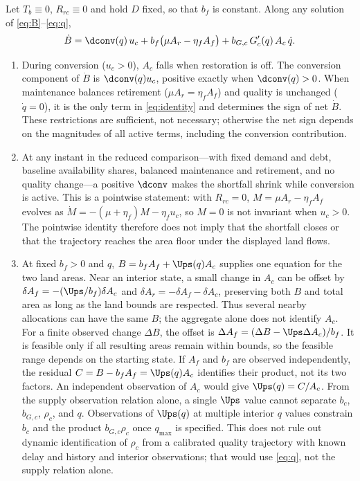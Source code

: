 \begin{proposition}\label{prop:mask}
Let $T_b\equiv0$, $R_{rc}\equiv0$ and hold $D$ fixed, so that $b_f$ is constant. Along any solution of \eqref{eq:B}--\eqref{eq:q},
\begin{equation}\label{eq:identity}
\dot B=\dconv(q)\,u_c+b_f\big(\mu A_r-\eta_f A_f\big)+b_{G,c}\,G_c'(q)\,A_c\,\dot q .
\end{equation}
\begin{enumerate}[label=(\roman*)]
\item During conversion ($u_c>0$), $A_c$ falls when restoration is off. The conversion component of $\dot B$ is $\dconv(q)u_c$, positive exactly when $\dconv(q)>0$. When maintenance balances retirement ($\mu A_r=\eta_fA_f$) and quality is unchanged ($\dot q=0$), it is the only term in \eqref{eq:identity} and determines the sign of net $\dot B$. These restrictions are sufficient, not necessary; otherwise the net sign depends on the magnitudes of all active terms, including the conversion contribution.
\item At any instant in the reduced comparison—with fixed demand and debt, baseline availability shares, balanced maintenance and retirement, and no quality change—a positive $\dconv$ makes the shortfall shrink while conversion is active. This is a pointwise statement: with $R_{rc}=0$, $M=\mu A_r-\eta_fA_f$ evolves as $\dot M=-(\mu+\eta_f)M-\eta_fu_c$, so $M=0$ is not invariant when $u_c>0$. The pointwise identity therefore does not imply that the shortfall closes or that the trajectory reaches the area floor under the displayed land flows.
\item At fixed $b_f>0$ and $q$, $B=b_fA_f+\Ups(q)A_c$ supplies one equation for the two land areas. Near an interior state, a small change in $A_c$ can be offset by $\delta A_f=-(\Ups/b_f)\delta A_c$ and $\delta A_r=-\delta A_f-\delta A_c$, preserving both $B$ and total area as long as the land bounds are respected. Thus several nearby allocations can have the same $B$; the aggregate alone does not identify $A_c$. For a finite observed change $\Delta B$, the offset is $\Delta A_f=(\Delta B-\Ups\Delta A_c)/b_f$. It is feasible only if all resulting areas remain within bounds, so the feasible range depends on the starting state. If $A_f$ and $b_f$ are observed independently, the residual $C=B-b_fA_f=\Ups(q)A_c$ identifies their product, not its two factors. An independent observation of $A_c$ would give $\Ups(q)=C/A_c$. From the supply observation relation alone, a single $\Ups$ value cannot separate $b_c$, $b_{G,c}$, $\rho_c$, and $q$. Observations of $\Ups(q)$ at multiple interior $q$ values constrain $b_c$ and the product $b_{G,c}\rho_c$ once $q_{\max}$ is specified. This does not rule out dynamic identification of $\rho_c$ from a calibrated quality trajectory with known delay and history and interior observations; that would use \eqref{eq:q}, not the supply relation alone.
\end{enumerate}
\end{proposition}

